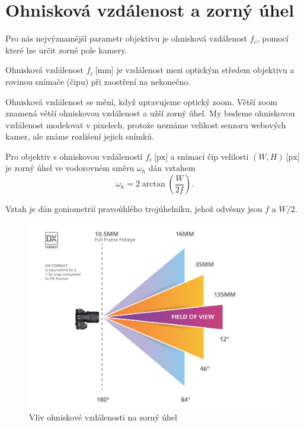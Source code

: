 \section{Ohnisková vzdálenost a zorný úhel}
 Pro nás nejvýznamější parametr objektivu je ohnisková vzdálenost $f_c$, pomocí které lze určit zorné pole kamery.

\begin{definice}\label{def01:3}
  Ohnisková vzdálenost $f_c~\text{[mm]}$ je vzdálenost mezi optickým středem objektivu a rovinou snímače (čipu) při zaostření na nekonečno. \citep{Hosko14}
\end{definice}

Ohnisková vzdálenost se mění, když upravujeme optický zoom. Větší zoom znamená větší ohniskovou vzdálenost a užší zorný úhel. 
My budeme ohniskovou vzdálenost modelovat v pixelech, protože neznáme velikost senzoru webových kamer, ale známe rozlišení jejich snímků.

\begin{lemma}\label{lemma01:1}
  Pro objektiv s ohniskovou vzdáleností $f_c~\text{[px]}$ a snímací čip velilosti $(W, H)~\text{[px]}$ je zorný úhel ve vodorovném směru $\omega_h$ dán vztahem
  \begin{equation}\label{eq01:1}
    \omega_h = 2 \arctan \left(\frac{W}{2f}\right).
  \end{equation}
\end{lemma}
\begin{dukaz}
  Vztah je dán goniometrií pravoúhlého trojúhelníku, jehož odvěsny jsou $f$ a $W/2$.
\end{dukaz}

\begin{figure}[h]\centering
  \includegraphics[width=140mm]{../img/fov}
  \caption{Vliv ohniskové vzdálenosti na zorný úhel \cite{nikon}}
\end{figure}


